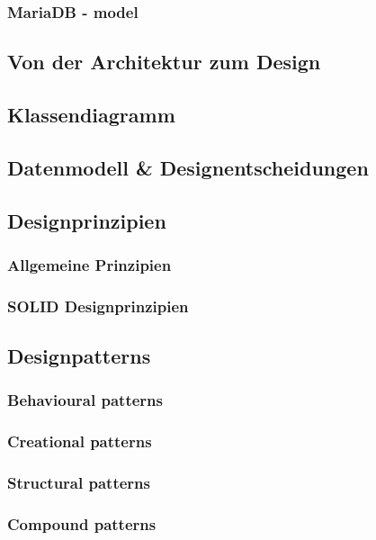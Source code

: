 \subsubsection{MariaDB - model}

\subsection{Von der Architektur zum Design}

\subsection{Klassendiagramm}

\subsection{Datenmodell \& Designentscheidungen}

\subsection{Designprinzipien}

\subsubsection{Allgemeine Prinzipien}

\subsubsection{SOLID Designprinzipien}

\subsection{Designpatterns}

\subsubsection{Behavioural patterns}

\subsubsection{Creational patterns}

\subsubsection{Structural patterns}

\subsubsection{Compound patterns}